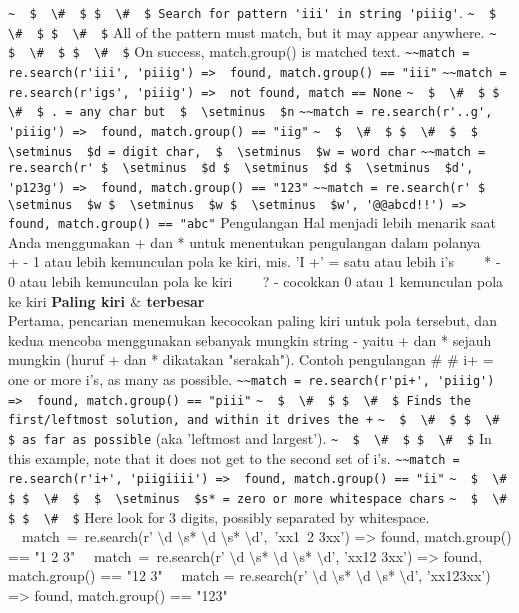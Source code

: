 \begin{enumerate}
\begin{enumerate}
\verb|~  $  \#  $ $  \#  $ Search for pattern 'iii' in string 'piiig'|.
\verb|~  $  \#  $ $  \#  $| All of the pattern must match, but it may appear anywhere.
\verb|~  $  \#  $ $  \#  $| On success, match.group() is matched text.
\verb|~~match = re.search(r'iii', 'piiig') =>  found, match.group() == "iii"|
\verb|~~match = re.search(r'igs', 'piiig') =>  not found, match == None|
\verb|~  $  \#  $ $  \#  $ . = any char but  $  \setminus  $n|
\verb|~~match = re.search(r'..g', 'piiig') =>  found, match.group() == "iig"|
\verb|~  $  \#  $ $  \#  $  $  \setminus  $d = digit char,  $  \setminus  $w = word char|
\verb|~~match = re.search(r' $  \setminus  $d $  \setminus  $d $  \setminus  $d', 'p123g') =>  found, match.group() == "123"|
\verb|~~match = re.search(r' $  \setminus  $w $  \setminus  $w $  \setminus  $w', '@@abcd!!') =>  found, match.group() == "abc"|
Pengulangan
Hal menjadi lebih menarik saat Anda menggunakan + dan * untuk menentukan pengulangan dalam polanya
~~~ + - 1 atau lebih kemunculan pola ke kiri, mis. 'I +' = satu atau lebih i's
~~~ * - 0 atau lebih kemunculan pola ke kiri
~~~ ? - cocokkan 0 atau 1 kemunculan pola ke kiri
{\fontsize{14pt}{14pt}\selectfont \textbf{Paling kiri  $  \&  $ terbesar} \\}
Pertama, pencarian menemukan kecocokan paling kiri untuk pola tersebut, dan kedua mencoba menggunakan sebanyak mungkin string - yaitu + dan * sejauh mungkin (huruf + dan * dikatakan "serakah").
Contoh pengulangan
 $  \#  $ $  \#  $ i+ = one or more i's, as many as possible.
\verb|~~match = re.search(r'pi+', 'piiig') =>  found, match.group() == "piii"|
\verb|~  $  \#  $ $  \#  $ Finds the first/leftmost solution, and within it drives the +|
\verb|~  $  \#  $ $  \#  $ as far as possible| (aka 'leftmost and largest').
\verb|~  $  \#  $ $  \#  $| In this example, note that it does not get to the second set of i's.
\verb|~~match = re.search(r'i+', 'piigiiii') =>  found, match.group() == "ii"|
\verb|~  $  \#  $ $  \#  $  $  \setminus  $s* = zero or more whitespace chars|
\verb|~  $  \#  $ $  \#  $| Here look for 3 digits, possibly separated by whitespace.
~~match~=~re.search(r' $  \setminus  $d $  \setminus  $s* $  \setminus  $d $  \setminus  $s* $  \setminus  $d',~'xx1~2   3xx') =>  found, match.group() == "1 2   3"
~~match~=~re.search(r' $  \setminus  $d $  \setminus  $s* $  \setminus  $d $  \setminus  $s* $  \setminus  $d', 'xx12  3xx') =>  found, match.group() == "12  3"
~~match = re.search(r' $  \setminus  $d $  \setminus  $s* $  \setminus  $d $  \setminus  $s* $  \setminus  $d', 'xx123xx') =>  found, match.group() == "123"

\end{enumerate}
\end{enumerate}
